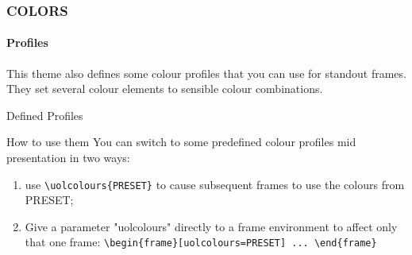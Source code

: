 \documentclass[
aspectratio=169,
]{beamer}
\begin{document}
    \begin{frame}[t,fragile]
    \frametitle{COLORS}
    \framesubtitle{Profiles}

    This theme also defines some colour profiles that you can use for standout frames.
    They set several colour elements to sensible colour combinations.

    \begin{block}{Defined Profiles}
    \end{block}




    \begin{block}{How to use them}
 You can switch to some predefined colour profiles mid presentation in two ways:
 \begin{enumerate}
     \item use \verb|\uolcolours{PRESET}| to cause subsequent frames to use the colours from PRESET;
     \item 
         Give a parameter "uolcolours" directly to a frame environment to affect only that one frame:
         \verb|\begin{frame}[uolcolours=PRESET] ... \end{frame}|
 \end{enumerate}
    \end{block}
\end{frame}
\end{document}
